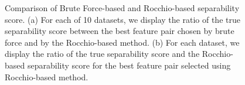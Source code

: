 \begin{figure}[h]
\centering %
\vspace{-2mm}
\vspace{-5mm}
\caption{Comparison of Brute Force-based and Rocchio-based separability score. (a) For each of 10 datasets, we display the ratio of the true separability score between the best feature pair chosen by brute force and by the Rocchio-based method. (b) For each dataset, we display the ratio of the true separability score and the Rocchio-based separability score for the best feature pair selected using Rocchio-based method.}
\vspace{-5mm}
\label{fig:brute_rocchio}
\end{figure}

